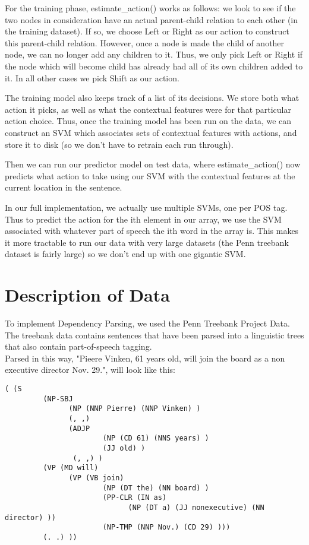 \documentclass[12pt,fleqn]{amsart}
\begin{document}
For the training phase, estimate\_action() works as follows: we look to see if
the two nodes in consideration have an actual parent-child relation to each 
other (in the training dataset). If so, we choose Left or Right as our action 
to construct this parent-child relation. However, once a node is made the 
child of another node, we can no longer add any children to it. Thus, we only
pick Left or Right if the node which will become child has already had all of
its own children added to it. In all other cases we pick Shift as our action.

The training model also keeps track of a list of its decisions. We store both
what action it picks, as well as what the contextual features were for that
particular action choice. Thus, once the training model has been run on the
data, we can construct an SVM which associates sets of contextual features 
with actions, and store it to disk (so we don't have to retrain each run
through).

Then we can run our predictor model on test data, where estimate\_action()
now predicts what action to take using our SVM with the contextual
features at the current location in the sentence.

In our full implementation, we actually use multiple SVMs, one per POS tag.
Thus to predict the action for the ith element in our array, we use the SVM
associated with whatever part of speech the ith word in the array is. This
makes it more tractable to run our data with very large datasets (the Penn
treebank dataset is fairly large) so we don't end up with one gigantic SVM.

\section{Description of Data}
To implement Dependency Parsing, we used the Penn Treebank Project Data. The treebank data contains sentences that have been parsed into a linguistic trees that also contain part-of-speech tagging. \\

Parsed in this way, "Pieere Vinken, 61 years old, will join the board as a non executive director Nov. 29.", will look like this: 
\begin{verbatim}
( (S
         (NP-SBJ 
               (NP (NNP Pierre) (NNP Vinken) )
               (, ,) 
               (ADJP
                       (NP (CD 61) (NNS years) )
                       (JJ old) )
                (, ,) )
         (VP (MD will) 
               (VP (VB join) 
                       (NP (DT the) (NN board) )
                       (PP-CLR (IN as) 
                             (NP (DT a) (JJ nonexecutive) (NN director) ))
                       (NP-TMP (NNP Nov.) (CD 29) )))
         (. .) ))\end{verbatim}
\end{document}
